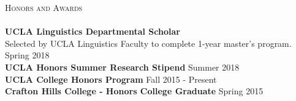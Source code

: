 \documentclass[]{article}
\newcommand{\lineunder} {
    \vspace*{-8pt} \\
    \hspace*{-18pt} \hrulefill \\
}
\newcommand{\header} [1] {
    {\hspace*{-18pt}\vspace*{6pt} \textsc{#1}}
    \vspace*{-6pt} \lineunder
}
\begin{document}
\header{Honors and Awards}
\textbf{UCLA Linguistics Departmental Scholar}\\
Selected by UCLA Linguistics Faculty to complete 1-year master’s program. \hfill Spring 2018\\
\vspace*{1mm}
\textbf{UCLA Honors Summer Research Stipend} \hfill Summer 2018\\
\vspace*{1mm}
\textbf{UCLA College Honors Program}
\hfill Fall 2015 - Present\\
\vspace*{1mm}
\textbf{Crafton Hills College - Honors College Graduate}
\hfill Spring 2015\\
\vspace*{1mm}
\end{document}
